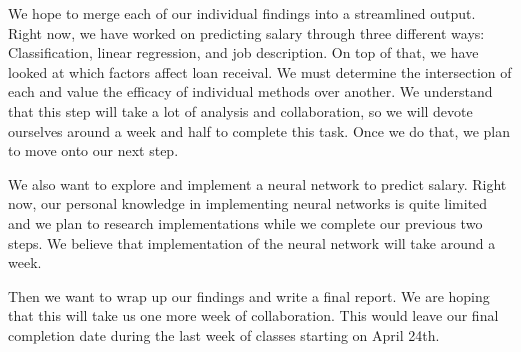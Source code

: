 \documentclass{article}
\begin{document}
We hope to merge each of our individual findings into a streamlined output. Right now, we have worked on predicting salary through three different ways: Classification, linear regression, and job description. On top of that, we have looked at which factors affect loan receival. We must determine the intersection of each and value the efficacy of individual methods over another. We understand that this step will take a lot of analysis and collaboration, so we will devote ourselves around a week and half to complete this task. Once we do that, we plan to move onto our next step. 

We also want to explore and implement a neural network to predict salary. Right now, our personal knowledge in implementing neural networks is quite limited and we plan to research implementations while we complete our previous two steps. We believe that implementation of the neural network will take around a week. 

Then we want to wrap up our findings and write a final report. We are hoping that this will take us one more week of collaboration. This would leave our final completion date during the last week of classes starting on April 24th. 




\end{document}
